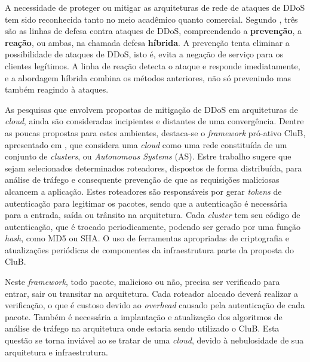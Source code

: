 
A necessidade de proteger ou mitigar as arquiteturas de rede de ataques de DDoS tem sido reconhecida tanto no meio acadêmico quanto comercial. Segundo \cite{1039856}, três são as linhas de defesa contra ataques de DDoS, compreendendo a \textbf{prevenção}, a \textbf{reação}, ou ambas, na chamada defesa \textbf{híbrida}. A prevenção tenta eliminar a possibilidade de ataques de DDoS, isto é, evita a negação de serviço para os clientes legítimos. A linha de reação detecta o ataque e responde imediatamente, e a abordagem híbrida combina os métodos anteriores, não só prevenindo mas também reagindo à ataques.

As pesquisas que envolvem propostas de mitigação de DDoS em arquiteturas de \emph{cloud}, ainda são consideradas incipientes e distantes de uma convergência. Dentre as poucas propostas para estes ambientes, destaca-se o \emph{framework} pró-ativo CluB, apresentado em \cite{Hazelhurst:2008:SCU:1456659.1456671}, que considera uma \emph{cloud} como uma rede constituída de um conjunto de \emph{clusters}, ou \emph{Autonomous Systems} (AS). Estre trabalho sugere
que sejam selecionados determinados roteadores, dispostos de forma distribuída, para análise de tráfego e consequente prevenção de que as requisições maliciosas alcancem a aplicação. Estes roteadores são responsáveis por gerar \emph{tokens} de autenticação para legitimar os pacotes, sendo que a autenticação é necessária para a entrada, saída ou trânsito na arquitetura. Cada \emph{cluster} tem seu código de autenticação, que é trocado periodicamente, podendo ser gerado por uma função \emph{hash}, como MD5 ou SHA. O uso de ferramentas apropriadas de criptografia e atualizações periódicas de componentes da infraestrutura parte da proposta do CluB.



Neste \emph{framework}, todo pacote, malicioso ou não, precisa ser verificado para entrar, sair ou transitar na arquitetura. Cada roteador alocado  deverá realizar a verificação, o que é custoso devido ao \emph{overhead} causado pela autenticação de cada pacote. Também é necessária a implantação e atualização dos algoritmos de análise de tráfego na arquitetura onde estaria sendo utilizado o CluB. Esta questão se torna inviável ao se tratar de uma \emph{cloud}, devido à nebulosidade de sua arquitetura e infraestrutura.

